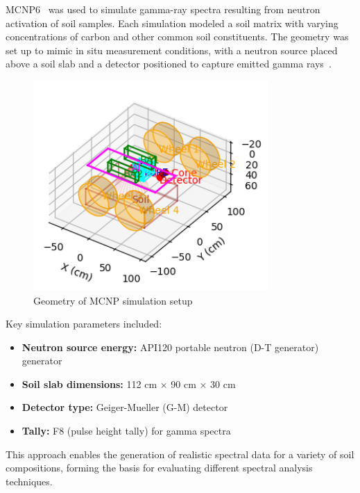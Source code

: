 \documentclass[review]{elsarticle}
\begin{document}
MCNP6~\cite{werner_mcnp_2017} was used to simulate gamma-ray spectra resulting from neutron activation of soil samples. Each simulation modeled a soil matrix with varying concentrations of carbon and other common soil constituents. The geometry was set up to mimic in situ measurement conditions, with a neutron source placed above a soil slab and a detector positioned to capture emitted gamma rays~\cite{kavetskiy_neutron_2017}.

\begin{figure}[H]
\centering
\includegraphics[width=0.8\textwidth]{../Figures/DataGeneration/MCNPGeometry.png}
\caption{Geometry of MCNP simulation setup}
\label{fig:mcnp_geometry}
\end{figure}

Key simulation parameters included:

\begin{itemize}
\item \textbf{Neutron source energy:} API120 portable neutron (D-T generator) generator~\cite{kavetskiy2018}
\item \textbf{Soil slab dimensions:} 112 cm × 90 cm × 30 cm
\item \textbf{Detector type:} Geiger-Mueller (G-M) detector~\cite{yakubova_measuring_2025}
\item \textbf{Tally:} F8 (pulse height tally) for gamma spectra
\end{itemize}

This approach enables the generation of realistic spectral data for a variety of soil compositions, forming the basis for evaluating different spectral analysis techniques.
\end{document}
